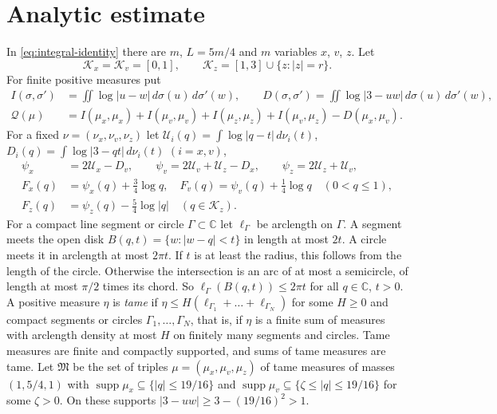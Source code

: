 \documentclass{amsart}
\numberwithin{equation}{section}
\numberwithin{table}{section}
\begin{document}
\section{Analytic estimate}\label{sec:analytic}

In \eqref{eq:integral-identity} there are $m$, $L=5m/4$ and $m$ variables
$x$, $v$, $z$. Let
\[
 \mathcal K_x=\mathcal K_v=[0,1],\qquad
 \mathcal K_z=[1,3]\cup\{z:|z|=r\}.
\]
For finite positive measures put
\begin{align*}
 I(\sigma,\sigma')&=\iint\log|u-w|\,d\sigma(u)\,d\sigma'(w),\qquad
 D(\sigma,\sigma')=\iint\log|3-uw|\,d\sigma(u)\,d\sigma'(w),\\
 \mathcal Q(\mu)&=I(\mu_x,\mu_x)+I(\mu_v,\mu_v)+I(\mu_z,\mu_z)
                +I(\mu_v,\mu_z)-D(\mu_x,\mu_v).
\end{align*}
For a fixed $\nu=(\nu_x,\nu_v,\nu_z)$ let
$\mathcal U_i(q)=\int\log|q-t|\,d\nu_i(t)$,
$D_i(q)=\int\log|3-qt|\,d\nu_i(t)$ $(i=x,v)$,
\begin{align*}
 \psi_x&=2\mathcal U_x-D_v,\qquad
 \psi_v=2\mathcal U_v+\mathcal U_z-D_x,\qquad
 \psi_z=2\mathcal U_z+\mathcal U_v,\\
 F_x(q)&=\psi_x(q)+\tfrac34\log q,\quad
 F_v(q)=\psi_v(q)+\tfrac14\log q\quad(0<q\le1),\\
F_z(q)&=\psi_z(q)-\tfrac54\log|q|\quad(q\in\mathcal K_z).
\end{align*}
For a compact line segment or circle $\Gamma\subset\mathbb C$ let
$\ell_\Gamma$ be arclength on $\Gamma$. A segment meets the open disk
$B(q,t)=\{w:|w-q|<t\}$ in length at most $2t$. A circle meets it in
arclength at most $2\pi t$. If $t$
is at least the radius, this follows from the length of the circle. Otherwise the
intersection is an arc of at most a semicircle, of length at most $\pi/2$
times its chord. So
$\ell_\Gamma(B(q,t))\le2\pi t$ for all $q\in\mathbb C$, $t>0$.
A positive measure $\eta$ is \emph{tame} if
$\eta\le H(\ell_{\Gamma_1}+\dots+\ell_{\Gamma_N})$ for some $H\ge0$ and
compact segments or circles $\Gamma_1,\ldots,\Gamma_N$, that is, if $\eta$
is a finite sum of measures with arclength density at most $H$ on finitely
many segments and circles. Tame measures are finite and compactly
supported, and sums of tame measures are tame. Let $\mathfrak M$ be the set
of triples $\mu=(\mu_x,\mu_v,\mu_z)$ of tame measures of masses $(1,5/4,1)$
with $\operatorname{supp}\mu_x\subseteq\{|q|\le19/16\}$ and
$\operatorname{supp}\mu_v\subseteq\{\zeta\le|q|\le19/16\}$ for some
$\zeta>0$. On these supports $|3-uw|\ge3-(19/16)^2>1$.
\end{document}
